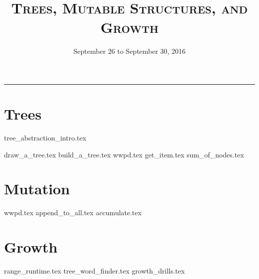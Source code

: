 \documentclass{exam}
\title{\textsc{Trees, Mutable Structures, and Growth}}
\date{September 26 to September 30, 2016}
\begin{document}
\maketitle
\rule{\textwidth}{0.15em}
\fontsize{12}{15}\selectfont


\section{Trees}
{tree_abstraction_intro.tex}

\begin{questions}
    {draw_a_tree.tex}
    {build_a_tree.tex}
    {wwpd.tex}
    {get_item.tex}
    {sum_of_nodes.tex}
\end{questions}
\newpage

\section{Mutation}
\begin{questions}
    {wwpd.tex}
    {append_to_all.tex}
    {accumulate.tex}
\end{questions}
\newpage

\section{Growth}
\begin{questions}
    {range_runtime.tex}
    {tree_word_finder.tex}
    {growth_drills.tex}
\end{questions}


\end{document}
